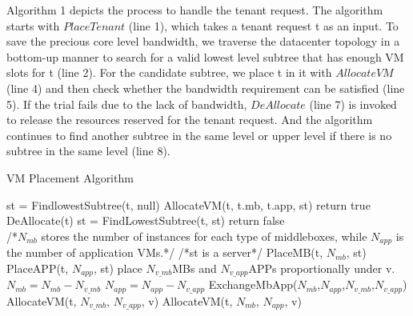 \documentclass[review]{elsarticle}
\begin{document}
Algorithm 1 depicts the process to handle the tenant request. The algorithm starts with $PlaceTenant$ (line 1), which takes a tenant request t as an input. To save the precious core level bandwidth, we traverse the datacenter topology in a bottom-up manner to search for a valid lowest level subtree that has enough VM slots for t (line 2). For the candidate subtree, we place t in it with $AllocateVM$ (line 4) and then check whether the bandwidth requirement can be satisfied (line 5). If the trial fails due to the lack of bandwidth, $DeAllocate$ (line 7) is invoked to release the resources reserved for the tenant request. And the algorithm continues to find another subtree in the same level or upper level if there is no subtree in the same level (line 8). 
\begin{algorithm}[!htbp]
	\caption{VM Placement Algorithm}
	\label{alg1}
	\begin{algorithmic}[1]
		\State st = FindlowestSubtree(t, null)
		   \State AllocateVM(t, t.mb, t.app, st)
			   \State return true
		   \EndIf 
		   \State DeAllocate(t)
		   \State st = FindLowestSubtree(t, st)
		\EndWhile
		\State return false
	  \EndFunction
	  \\
	  /*$N_{mb}$ stores the number of instances for each type of middleboxes, while $N_{app}$ is the number of application VMs.*/
	   /*st is a server*/
		  \State PlaceMB(t, $N_{mb}$, st)
		  \State PlaceAPP(t, $N_{app}$, st)
	  \Else
				  \State place $N_{v\_mb}$MBs and $N_{v\_app}$APPs \State proportionally under v.
				  \State $N_{mb} = N_{mb} - N_{v\_mb}$
				  \State $N_{app} = N_{app} - N_{v\_app}$
				  \State ExchangeMbApp($N_{mb}$,$N_{app}$,$N_{v\_mb}$,$N_{v\_app}$)
				  \State AllocateVM(t, $N_{v\_mb}$, $N_{v\_app}$, v)
		      \Else
			      \State AllocateVM(t, $N_{mb}$, $N_{app}$, v)
			  \EndIf
		\EndIf
	  \EndFor
	\EndIf
   \EndFunction %
\end{algorithmic}
\end{algorithm}
\end{document}
